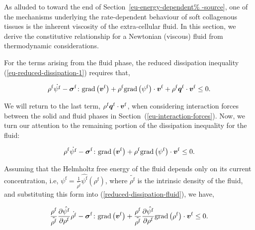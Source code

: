 As alluded to toward the end of Section~\ref{eu-energy-dependent%
  -source}, one of the mechanisms underlying the rate-dependent
behaviour of soft collagenous tissues is the inherent viscosity of the
extra-cellular fluid. In this section, we derive the constitutive
relationship for a Newtonian (viscous) fluid from thermodynamic
considerations.

For the terms arising from the fluid phase, the reduced dissipation
inequality (\ref{eu-reduced-dissipation-1}) requires that,

\begin{equation*}
\rho^{\mathrm{f}} \dot{\psi^{\mathrm{f}}}
-\mbox{\boldmath$\sigma$}^{\mathrm{f}}\colon\mathrm{grad}\left(\mbox{\boldmath$ v$}^{\mathrm{f}}\right)+
\rho^{\mathrm{f}} \mathrm{grad}\left(\psi^{\mathrm{f}}\right)
\cdot\mbox{\boldmath$ v$}^{\mathrm{f}} +\rho^{\mathrm{f}}
\mbox{\boldmath$ q$}^{\mathrm{f}}\cdot\mbox{\boldmath$ v$}^{\mathrm{f}} \leq 0.
\end{equation*}

\noindent We will return to the last term, $\rho^{\mathrm{f}}
\mbox{\boldmath$ q$}^{\mathrm{f}} \cdot \mbox{\boldmath$ v$}^{\mathrm{f}}$, when considering interaction
forces between the solid and fluid phases in
Section~(\ref{eu-interaction-forces}). Now, we turn our attention to
the remaining portion of the dissipation inequality for the fluid:

\begin{equation}
\rho^{\mathrm{f}} \dot{\psi^{\mathrm{f}}} -\mbox{\boldmath$\sigma$}^{\mathrm{f}} \colon
\mathrm{grad}\left(\mbox{\boldmath$ v$}^{\mathrm{f}}\right)+ \rho^{\mathrm{f}}
\mathrm{grad} \left(\psi^{\mathrm{f}}\right) \cdot\mbox{\boldmath$ v$}^{\mathrm{f}}
\leq 0.
\label{reduced-dissipation-fluid}
\end{equation}

Assuming that the Helmholtz free energy of the fluid depends only on
its current concentration, i.e, $\psi^{\mathrm{f}} = \frac{1}
{\tilde{\rho^{\mathrm{f}}}} \hat{\psi^{\mathrm{f}}}
(\rho^{\mathrm{f}})$, where $\tilde{\rho^{\mathrm{f}}}$ is the
intrinsic density of the fluid, and substituting this form into
(\ref{reduced-dissipation-fluid}), we have,

\begin{equation*}
\frac{\rho^{\mathrm{f}}}{\tilde{\rho^{\mathrm{f}}}}
\frac{\partial \hat{\psi^{\mathrm{f}}}}{\partial \rho^{\mathrm{f}}}
\dot{\rho^{\mathrm{f}}}
-\mbox{\boldmath$\sigma$}^{\mathrm{f}}\colon\mathrm{grad}
\left(\mbox{\boldmath$ v$}^{\mathrm{f}}\right) +
\frac{\rho^{\mathrm{f}}}{\tilde{\rho^{\mathrm{f}}}}
\frac{\partial \hat{\psi^{\mathrm{f}}}}{\partial \rho^{\mathrm{f}}}
\mathrm{grad}\left(\rho^{\mathrm{f}}\right) 
\cdot\mbox{\boldmath$ v$}^{\mathrm{f}}
\leq 0.
\end{equation*}

